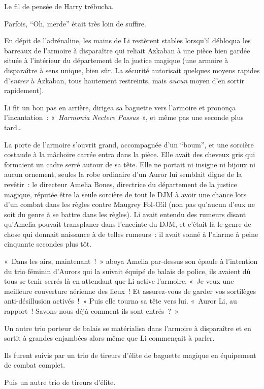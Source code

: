 Le fil de pensée de Harry trébucha.

Parfois, “Oh, merde” était très loin de suffire.

\later

En dépit de l'adrénaline, les mains de Li restèrent stables lorsqu'il débloqua les barreaux de l'armoire à disparaître qui reliait Azkaban à une pièce bien gardée située à l'intérieur du département de la justice magique (une armoire à disparaître à sens unique, bien sûr.
La sécurité autorisait quelques moyens rapides d'\emph{entrer} à Azkaban, tous hautement restreints, mais \emph{aucun} moyen d'en sortir rapidement).

Li fit un bon pas en arrière, dirigea sa baguette vers l'armoire et prononça l'incantation~: «~\emph{Harmonia Nectere Passus}~», et même pas une seconde plus tard…

La porte de l'armoire s'ouvrit grand, accompagnée d'un “boum”, et une sorcière costaude à la mâchoire carrée entra dans la pièce.
Elle avait des cheveux gris qui formaient un cadre serré autour de sa tête.
Elle ne portait ni insigne ni bijoux ni aucun ornement, seules la robe ordinaire d'un Auror lui semblait digne de la revêtir~: le directeur Amelia Bones, directrice du département de la justice magique, réputée être la seule sorcière de tout le DJM à avoir une chance lors d'un combat dans les règles contre Maugrey Fol-Œil (non pas qu'aucun d'eux ne soit du genre à se battre dans les règles).
Li avait entendu des rumeurs disant qu'Amelia pouvait transplaner dans l'enceinte du DJM, et c'était là le genre de chose qui donnait naissance à de telles rumeurs~: il avait sonné à l'alarme à peine cinquante secondes plus tôt.

«~Dans les airs, maintenant~!~»
aboya Amelia par-dessus son épaule à l'intention du trio féminin d'Aurors qui la suivait équipé de balais de police, ils avaient dû tous se tenir serrés là en attendant que Li active l'armoire.
«~Je veux une meilleure couverture aérienne des lieux~!
Et assurez-vous de garder vos sortilèges anti-désillusion activés~!~»
Puis elle tourna sa tête vers lui.
«~Auror Li, au rapport~!
Savons-nous déjà comment ils sont entrés~?~»

Un autre trio porteur de balais se matérialisa dans l'armoire à disparaître et en sortit à grandes enjambées alors même que Li commençait à parler.

Ils furent suivis par un trio de tireurs d'élite de baguette magique en équipement de combat complet.

Puis un autre trio de tireurs d'élite.

